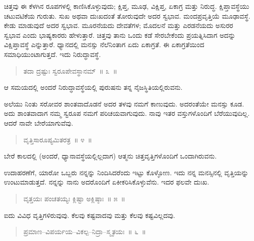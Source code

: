 ಚಿತ್ತವು ಈ ಕೆಳಗಿನ ರೂಪಗಳಲ್ಲಿ ಕಾಣಿಸಿಕೊಳ್ಳುವುದು; ಕ್ಷಿಪ್ತ, ಮೂಢ, ವಿಕ್ಷಿಪ್ತ, ಏಕಾಗ್ರ ಮತ್ತು ನಿರುದ್ಧ. ಕ್ಷಿಪ್ತಾವಸ್ಥೆಯು ಚಟುವಟಿಕೆಯ ಗುರುತು. ಸುಖ ಅಥವಾ ದುಃಖದಂತೆ ತೋರುವುದೇ ಅದರ ಸ್ವಭಾವ. ಮಂದಪ್ರವೃತ್ತಿಯೆ ಮೂಢಾವಸ್ಥೆ. ಕೇಡು ಮಾಡುವುದೆ ಅದರ ಸ್ವಭಾವ. ಮೂರನೆಯದು ದೇವತೆಗಳ; ಮೊದಲನೆ ಮತ್ತು ಎರಡನೆಯದು ಅಸುರರ ಸ್ವಭಾವ ಎಂದು ಭಾಷ್ಯಕಾರರು ಹೇಳುತ್ತಾರೆ. ಚಿತ್ತವು ತಾನು ಒಂದು ಕಡೆ ಸೇರಬೇಕೆಂದು ಪ್ರಯತ್ನಿಸಿದಾಗ ಅದನ್ನು ವಿಕ್ಷಿಪ್ತಾವಸ್ಥೆ ಎನ್ನುತ್ತಾರೆ. ಧ್ಯಾನದಲ್ಲಿ ಮನಸ್ಸು ನೆಲೆನಿಂತಾಗ ಏದು ಏಕಾಗ್ರತೆ. ಈ ಏಕಾಗ್ರತೆಯಿಂದ ಸಮಾಧಿಯುಂಟಾಗುತ್ತದೆ. ಇದು ನಿರುದ್ಧಾವಸ್ಥೆ. 

\vspace{-0.2cm}

\begin{verse}
ತದಾ ದ್ರಷ್ಟುಃ ಸ್ವರೂಪೇವಸ್ಥಾನಮ್​~॥ ೩~॥
\end{verse}

\vspace{-0.1cm}

ಆ ಸಮಯದಲ್ಲಿ ಅಂದರೆ ನಿರುದ್ಧಾವಸ್ಥೆಯಲ್ಲಿ ಪುರುಷನು ತನ್ನ ನೈಜಸ್ಥಿತಿಯಲ್ಲಿರುವನು. 

ಅಲೆಯು ನಿಂತು ಸರೋವರ ಶಾಂತವಾದೊಡನೆ ಅದರ ತಳವು ನಮಗೆ ಕಾಣುವುದು. ಅದರಂತೆಯೇ ಮನಸ್ಸು ಕೂಡ. ಅದು ಶಾಂತವಾದಾಗ ನಮ್ಮ ಸ್ವರೂಪ ನಮಗೆ ಪರಿಚಯವಾಗುವುದು. ನಾವು ಇತರ ವಸ್ತುಗಳೊಂದಿಗೆ ಬೆರೆಯುವುದಿಲ್ಲ. ಆದರೆ ನಾವೇ ಬೇರೆಯಾಗುವೆವು. 

\vspace{-0.2cm}

\begin{verse}
ವೃತ್ತಿಸಾರೂಪ್ಯಮಿತರತ್ರ~॥ ೪~॥
\end{verse}

\vspace{-0.1cm}

ಬೇರೆ ಕಾಲದಲ್ಲಿ (ಅಂದರೆ, ಧ್ಯಾನಾವಸ್ಥೆಯಲ್ಲಿಲ್ಲದಾಗ) ಆತ್ಮನು ಚಿತ್ತವೃತ್ತಿಗಳೊಂದಿಗೆ ಒಂದಾಗಿರುವನು. 

ಉದಾಹರಣೆಗೆ, ಯಾರೋ ಒಬ್ಬರು ನನ್ನನ್ನು ನಿಂದಿಸಿದರೆಂದು ಇಟ್ಟು ಕೊಳ್ಳೋಣ. ಇದು ನನ್ನ ಮನಸ್ಸಿನಲ್ಲಿ ವೃತ್ತಿಯನ್ನು ಉಂಟುಮಾಡುತ್ತದೆ. ನನ್ನನ್ನು ನಾನು ಅದರೊಂದಿಗೆ ಏಕೀಕರಿಸಿಕೊಳ್ಳುವೆನು. ಇದರ ಫಲವೇ ದುಃಖ. 

\vspace{-0.2cm}

\begin{verse}
ವೃತ್ತಯಃ ಪಂಚತಯ್ಯಃ ಕ್ಲಿಷ್ಟಾ ಅಕ್ಲಿಷ್ಠಾಃ~॥ ೫~॥
\end{verse}

\vspace{-0.1cm}

ಐದು ವಿವಿಧ ವೃತ್ತಿಗಳಿರುವುವು. ಕೆಲವು ಕಷ್ಟವಾದವು ಮತ್ತು ಕೆಲವು ಕಷ್ಟವಿಲ್ಲದವು. 

\vspace{-0.2cm}

\begin{verse}
ಪ್ರಮಾಣ–ವಿಪರ್ಯಯ–ವಿಕಲ್ಪ–ನಿದ್ರಾ–ಸ್ಮೃತಯಃ~॥ ೬~॥
\end{verse}

